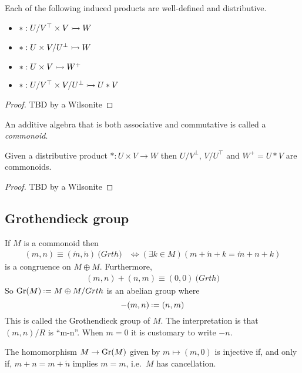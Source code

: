 \begin{proposition}
    Each of the following induced products are well-defined and distributive.
    \begin{itemize}
        \item $*:U/V^{\top} \times V\rightarrowtail W$
        \item $*:U \times V/U^{\bot}\rightarrowtail W$
        \item $*:U \times V\rightarrowtail W^+$
        \item $*:U/V^{\top} \times V/U^{\bot}\rightarrowtail U*V$
    \end{itemize}
\end{proposition}
\begin{proof}
    TBD by a Wilsonite
\end{proof}

\begin{definition}
    An additive algebra that is both associative and commutative is called a \emph{commonoid}.
\end{definition}

\begin{proposition}
    Given a distributive product $*:U\times V\to W$ then 
    $U/V^{\bot}$, $V/U^{\top}$ and $W^+=U*V$ are commonoids.
\end{proposition}
\begin{proof}
    TBD by a Wilsonite
\end{proof}


\subsection{Grothendieck group}

\begin{theorem}
    If $M$ is a commonoid then 
    \begin{align*}
        (m,n) \equiv (\acute{m},\acute{n}) \pod{Grth} & \Leftrightarrow (\exists k\in M)(m+\acute{n}+k=\acute{m}+n+k)
    \end{align*}
    is a congruence on $M\oplus M$.  Furthermore,
    \begin{align*}
        (m,n)+(n,m) \equiv (0,0) \pod{Grth}
    \end{align*}
    So $\Gr(M)\defeq M\oplus M/Grth$ is an abelian group where 
    \[
        -(m,n)\defeq (n,m)
    \]
    This is called the Grothendieck group of $M$.
    The interpretation is that $(m,n)/R$ is ``m-n''.  When $m=0$ it is customary to write $-n$.

    The homomorphism $M\to \operatorname{Gr}(M)$ given by $m\mapsto (m,0)$ is injective 
    if, and only if, $m+n=m+\acute{n}$ implies $m=m$, i.e.\ $M$ has cancellation.
\end{theorem}

